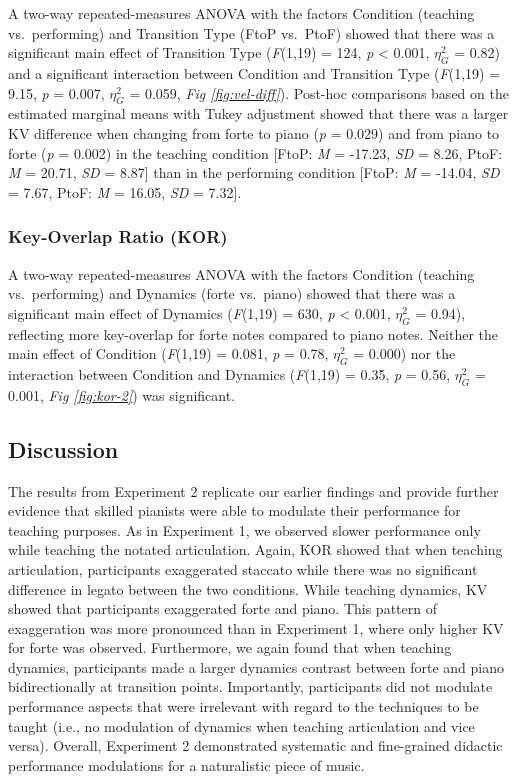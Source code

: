 \documentclass[
  english,
  man,floatsintext]{apa6}
\begin{document}
A two-way repeated-measures ANOVA with the factors Condition (teaching vs.~performing) and Transition Type (FtoP vs.~PtoF) showed that there was a significant main effect of Transition Type (\emph{F}(1,19) = 124, \emph{p} \textless{} 0.001, \(\eta_G^2\) = 0.82) and a significant interaction between Condition and Transition Type (\emph{F}(1,19) = 9.15, \emph{p} = 0.007, \(\eta_G^2\) = 0.059, \emph{Fig \ref{fig:vel-diff}}). Post-hoc comparisons based on the estimated marginal means with Tukey adjustment showed that there was a larger KV difference when changing from forte to piano (\emph{p} = 0.029) and from piano to forte (\emph{p} = 0.002) in the teaching condition {[}FtoP: \emph{M} = -17.23, \emph{SD} = 8.26, PtoF: \emph{M} = 20.71, \emph{SD} = 8.87{]} than in the performing condition {[}FtoP: \emph{M} = -14.04, \emph{SD} = 7.67, PtoF: \emph{M} = 16.05, \emph{SD} = 7.32{]}.

\hypertarget{key-overlap-ratio-kor-1}{%
\subsubsection{Key-Overlap Ratio (KOR)}\label{key-overlap-ratio-kor-1}}

A two-way repeated-measures ANOVA with the factors Condition (teaching vs.~performing) and Dynamics (forte vs.~piano) showed that there was a significant main effect of Dynamics (\emph{F}(1,19) = 630, \emph{p} \textless{} 0.001, \(\eta_G^2\) = 0.94), reflecting more key-overlap for forte notes compared to piano notes. Neither the main effect of Condition (\emph{F}(1,19) = 0.081, \emph{p} = 0.78, \(\eta_G^2\) = 0.000) nor the interaction between Condition and Dynamics (\emph{F}(1,19) = 0.35, \emph{p} = 0.56, \(\eta_G^2\) = 0.001, \emph{Fig \ref{fig:kor-2}}) was significant.

\hypertarget{discussion-1}{%
\subsection{Discussion}\label{discussion-1}}

The results from Experiment 2 replicate our earlier findings and provide further evidence that skilled pianists were able to modulate their performance for teaching purposes. As in Experiment 1, we observed slower performance only while teaching the notated articulation. Again, KOR showed that when teaching articulation, participants exaggerated staccato while there was no significant difference in legato between the two conditions. While teaching dynamics, KV showed that participants exaggerated forte and piano. This pattern of exaggeration was more pronounced than in Experiment 1, where only higher KV for forte was observed. Furthermore, we again found that when teaching dynamics, participants made a larger dynamics contrast between forte and piano bidirectionally at transition points. Importantly, participants did not modulate performance aspects that were irrelevant with regard to the techniques to be taught (i.e., no modulation of dynamics when teaching articulation and vice versa). Overall, Experiment 2 demonstrated systematic and fine-grained didactic performance modulations for a naturalistic piece of music.
\end{document}
